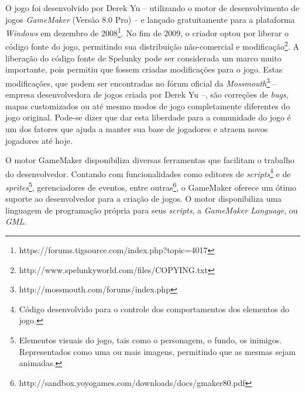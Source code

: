 O jogo foi desenvolvido por Derek Yu -- utilizando o motor de desenvolvimento de
jogos \textit{GameMaker} (Versão 8.0 Pro) -- e lançado gratuitamente para a
plataforma \textit{Windows} em dezembro de
2008\footnote{https://forums.tigsource.com/index.php?topic=4017}. No fim de
2009, o criador optou por liberar o código fonte do jogo, permitindo sua
distribuição não-comercial e
modificação\footnote{http://www.spelunkyworld.com/files/COPYING.txt}. A
liberação do código fonte de Spelunky pode ser considerada um marco muito
importante, pois permitiu que fossem criadas modificações para o jogo. Estas
modificações, que podem ser encontradas no fórum oficial da
\textit{Mossmouth}\footnote{http://mossmouth.com/forums/index.php} -- empresa
desenvolvedora de jogos criada por Derek Yu --, são correções de \textit{bugs},
mapas customizados ou até mesmo modos de jogo completamente diferentes do jogo
original. Pode-se dizer que dar esta liberdade para a comunidade do jogo é um
dos fatores que ajuda a manter sua base de jogadores e atraem novos jogadores
até hoje.

O motor GameMaker disponibiliza diversas ferramentas que facilitam o trabalho
do desenvolvedor. Contando com funcionalidades como editores de
\textit{scripts}\footnote{Código desenvolvido para o controle dos
comportamentos dos elementos do jogo.} e de \textit{sprites}\footnote{Elementos
visuais do jogo, tais como o personagem, o fundo, os inimigos. Representados
como uma ou mais imagens, permitindo que as mesmas sejam animadas.},
gerenciadores de eventos, entre
outras\footnote{http://sandbox.yoyogames.com/downloads/docs/gmaker80.pdf}, o
GameMaker oferece um ótimo suporte ao desenvolvedor para a criação de jogos. O
motor disponibiliza uma linguagem de programação própria para seus
\textit{scripts}, a \textit{GameMaker Language}, ou \textit{GML}.

